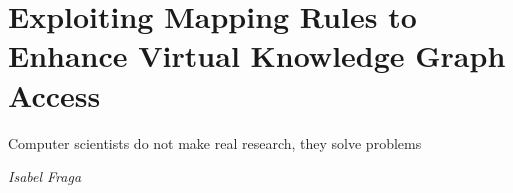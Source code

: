 
\chapter{Exploiting Mapping Rules to Enhance Virtual Knowledge Graph Access}
\label{chapter:virtual}
\epigraph{Computer scientists do not make real research, they solve problems}{\textit{Isabel Fraga}}



